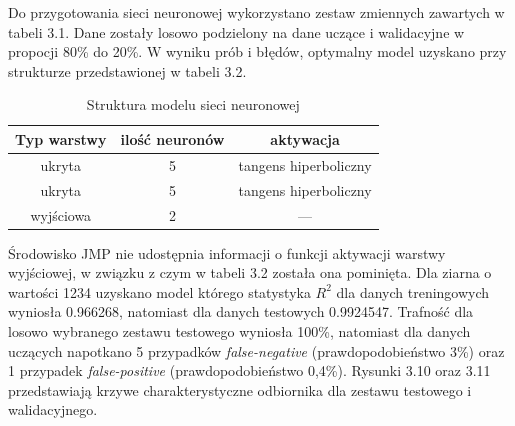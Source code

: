 Do przygotowania sieci neuronowej wykorzystano zestaw zmiennych zawartych w tabeli 3.1. Dane zostały losowo podzielony na dane uczące i walidacyjne w propocji 80\% do 20\%. W wyniku prób i błędów, optymalny model uzyskano przy strukturze przedstawionej w tabeli 3.2.

\newpage
\begin{table}
	\centering
	\begin{tabular}{c|c|c}
		Typ warstwy & ilość neuronów & aktywacja \\
		\hline
		ukryta & 5 & tangens hiperboliczny \\
		ukryta & 5 & tangens hiperboliczny \\
		wyjściowa & 2 & ---	
	\end{tabular}
	\caption{Struktura modelu sieci neuronowej}
	\label{neural:1}
\end{table}

Środowisko JMP nie udostępnia informacji o funkcji aktywacji warstwy wyjściowej, w związku z czym w tabeli 3.2 została ona pominięta. Dla ziarna o wartości 1234 uzyskano model którego statystyka $R^{2}$ dla danych treningowych wyniosła 0.966268, natomiast dla danych testowych 0.9924547. Trafność dla losowo wybranego zestawu testowego wyniosła 100\%, natomiast dla danych uczących napotkano 5 przypadków \textit{false-negative} (prawdopodobieństwo 3\%) oraz 1 przypadek \textit{false-positive} (prawdopodobieństwo 0,4\%). Rysunki 3.10 oraz 3.11 przedstawiają krzywe charakterystyczne odbiornika dla zestawu testowego i walidacyjnego.


